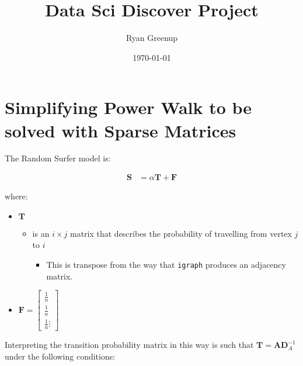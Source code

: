 \documentclass[11pt]{article}
\author{Ryan Greenup}
\date{\today}
\title{Data Sci Discover Project}
\begin{document}
\maketitle
\tableofcontents

\section{Simplifying Power Walk to be solved with Sparse Matrices}
\label{sec:orgb80aad4}
The Random Surfer model is:

$$\begin{aligned}
    \mathbf{S} &= \alpha \mathbf{T} +  \mathbf{F}  \label{eq:sparse-RS}\end{aligned}$$

where:

\begin{itemize}
\item \(\mathbf{T}\)

\begin{itemize}
\item is an \(i \times j\) matrix that describes the probability of
travelling from vertex \(j\) to \(i\)

\begin{itemize}
\item This is transpose from the way that \texttt{igraph} produces an adjacency
matrix.
\end{itemize}
\end{itemize}

\item \(\mathbf{F} = \begin{bmatrix} \frac{1}{n} \\ \frac{1}{n} \\ \frac{1}{n} \vdots \end{bmatrix}\)
\end{itemize}

Interpreting the transition probability matrix in this way is such that
\(\mathbf{T}= \mathbf{A}\mathbf{D}^{- 1}_A\) under the following
conditions:
\end{document}
